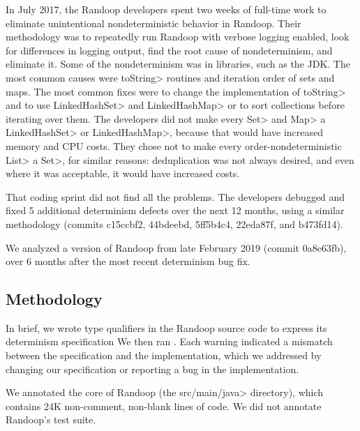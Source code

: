 In July 2017, the Randoop developers spent two weeks of full-time work to
eliminate unintentional nondeterministic behavior in Randoop.
Their methodology was to repeatedly
 run Randoop with verbose logging enabled,
 look for differences in logging output,
 find the root cause of nondeterminism,
 and eliminate it.
Some of the nondeterminism was in libraries, such as the JDK\@.
The most common causes were \<toString> routines and iteration order of sets and maps.
The most common fixes were to change the implementation of \<toString>
and to use \<LinkedHashSet> and \<LinkedHashMap> or to sort collections
before iterating over them.
The developers did not make every \<Set> and \<Map> a \<LinkedHashSet> or \<LinkedHashMap>, because that
would have increased memory and CPU costs.  They chose not to make every
order-nondeterministic \<List> a \<Set>, for similar reasons:  deduplication was
not always desired, and even where it was acceptable, it would have increased costs.

That coding sprint did not find all the problems.
The developers debugged and fixed 5 additional determinism defects over the
next 12 months, using a similar methodology
(commits c15ccbf2, 44bdeebd, 5ff5b4c4, 22eda87f, and b473fd14).


We analyzed a version of Randoop from late February 2019 (commit 0a8e63fb), over 6 months after the most recent determinism bug fix.


\subsection{Methodology}

In brief, we wrote type qualifiers in the Randoop source code to express its
determinism specification
We then ran
\theDeterminismChecker.  Each warning indicated a mismatch between the
specification and the implementation, which we addressed by changing our
specification or reporting a bug in the implementation.

We annotated the core of Randoop (the \<src/main/java> directory), which
contains 24K non-comment, non-blank lines of code.
We did not annotate Randoop's test suite.

